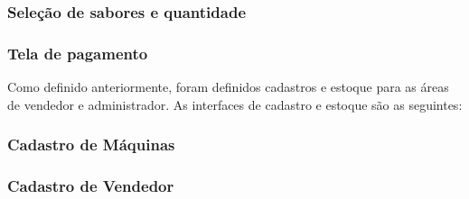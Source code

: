 

\subsubsection{Seleção de sabores e quantidade}


\subsubsection{Tela de pagamento}


Como definido anteriormente, foram definidos cadastros e estoque para as áreas de vendedor e administrador. As interfaces de cadastro e estoque são as seguintes: 

\subsubsection{Cadastro de Máquinas}


\subsubsection{Cadastro de Vendedor}


